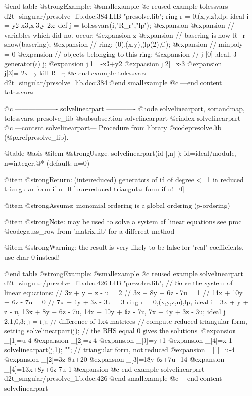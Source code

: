 @end table
@strong{Example:}
@smallexample
@c reused example tolessvars d2t_singular/presolve_lib.doc:384 
LIB "presolve.lib";
ring r  = 0,(x,y,z),dp;
ideal i = y2-x3,x-3,y-2x;
def j   = tolessvars(i,"R_r","lp");
@expansion{} 
@expansion{} // variables which did not occur:
@expansion{} z
@expansion{} // basering is now R_r
show(basering);
@expansion{} // ring: (0),(x,y),(lp(2),C);
@expansion{} // minpoly = 0
@expansion{} // objects belonging to this ring:
@expansion{} // j                    [0]  ideal, 3 generator(s)
j;
@expansion{} j[1]=-x3+y2
@expansion{} j[2]=x-3
@expansion{} j[3]=-2x+y
kill R_r;
@c end example tolessvars d2t_singular/presolve_lib.doc:384
@end smallexample
@c ---end content tolessvars---

@c ------------------- solvelinearpart -------------
@node solvelinearpart, sortandmap, tolessvars, presolve_lib
@subsubsection solvelinearpart
@cindex solvelinearpart
@c ---content solvelinearpart---
Procedure from library @code{presolve.lib} (@pxref{presolve_lib}).

@table @asis
@item @strong{Usage:}
solvelinearpart(id [,n] ); id=ideal/module, n=integer,@*
(default: n=0)

@item @strong{Return:}
(interreduced) generators of id of degree <=1 in reduced triangular
form if n=0 [non-reduced triangular form if n!=0]

@item @strong{Assume:}
monomial ordering is a global ordering (p-ordering)

@item @strong{Note:}
may be used to solve a system of linear equations
see proc @code{gauss_row} from 'matrix.lib' for a different method

@item @strong{Warning:}
the result is very likely to be false for 'real' coefficients, use
char 0 instead!

@end table
@strong{Example:}
@smallexample
@c reused example solvelinearpart d2t_singular/presolve_lib.doc:426 
LIB "presolve.lib";
// Solve the system of linear equations:
//         3x +   y +  z -  u = 2
//         3x +  8y + 6z - 7u = 1
//        14x + 10y + 6z - 7u = 0
//         7x +  4y + 3z - 3u = 3
ring r = 0,(x,y,z,u),lp;
ideal i= 3x +   y +  z -  u,
13x +  8y + 6z - 7u,
14x + 10y + 6z - 7u,
7x +  4y + 3z - 3u;
ideal j= 2,1,0,3;
j = i-j;                        // difference of 1x4 matrices
// compute reduced triangular form, setting
solvelinearpart(j);             // the RHS equal 0 gives the solutions!
@expansion{} _[1]=u-4
@expansion{} _[2]=z-4
@expansion{} _[3]=y+1
@expansion{} _[4]=x-1
solvelinearpart(j,1); "";       // triangular form, not reduced
@expansion{} _[1]=u-4
@expansion{} _[2]=3z-8u+20
@expansion{} _[3]=18y-6z+7u+14
@expansion{} _[4]=13x+8y+6z-7u-1
@expansion{} 
@c end example solvelinearpart d2t_singular/presolve_lib.doc:426
@end smallexample
@c ---end content solvelinearpart---

